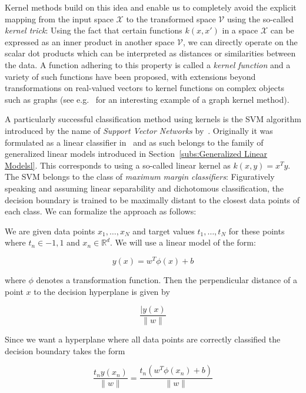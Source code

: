 Kernel methods build on this idea and enable us to completely avoid the explicit mapping from the input space $\mathcal{X}$ to the transformed space $\mathcal{V}$ using the so-called \emph{kernel trick}: Using the fact that certain functions $k(x, x')$ in a space $\mathcal{X}$ can be expressed as an inner product in another space $\mathcal{V}$, we can directly operate on the scalar dot products which can be interpreted as distances or similarities between the data. A function adhering to this property is called a \emph{kernel function} and a variety of such functions have been proposed, with extensions beyond transformations on real-valued vectors to kernel functions on complex objects such as graphs (see e.g.~\cite{Shervashidze:2011aa} for an interesting example of a graph kernel method).

A particularly successful classification method using kernels is the \gls{SVM} algorithm introduced by the name of \emph{Support Vector Networks} by~\cite{Cortes:aa}. Originally it was formulated as a linear classifier in~\cite{Vapnik:1982aa} and as such belongs to the family of generalized linear models introduced in Section~\ref{subs:Generalized Linear Modelsl}. This corresponds to using a so-called linear kernel as $k(x, y) = x^T y$. The \gls{SVM} belongs to the class of \emph{maximum margin classifiers}: Figuratively speaking and assuming linear separability and dichotomous classification, the decision boundary is trained to be maximally distant to the closest data points of each class. We can formalize the approach as follows:

We are given data points $x_1, \ldots, x_N$ and target values $t_1, \ldots, t_N$ for these points where $t_n \in {-1, 1}$ and $x_n \in \mathbb{R}^d$. We will use a linear model of the form:

\begin{equation}
	y(x) = w^T \phi(x) + b
	\label{eq:svm linear model}
\end{equation}

where $\phi$ denotes a transformation function. Then the perpendicular distance of a point $x$ to the decision hyperplane is given by

\begin{equation}
	\frac{|y(x)}{\|w\|}
\end{equation}

Since we want a hyperplane where all data points are correctly classified the decision boundary takes the form

\begin{equation}
	\frac{t_n y(x_n)}{\|w\|} = \frac{t_n (w^T \phi(x_n) + b)}{\|w\|}
\end{equation}

